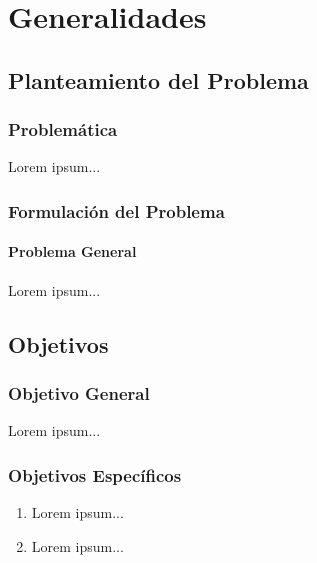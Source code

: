 \chapter{Generalidades}
\doublespacing %
\raggedbottom %
\section{Planteamiento del Problema}

\subsection{Problemática}

Lorem ipsum...

\subsection{Formulación del Problema}

\subsubsection{Problema General}

Lorem ipsum...

\section{Objetivos}

\subsection{Objetivo General}

Lorem ipsum...

\subsection{Objetivos Específicos}

\begin{enumerate}
	\item Lorem ipsum...
	\item Lorem ipsum...
\end{enumerate}

